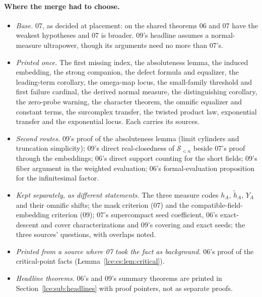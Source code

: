 \documentclass[11pt,letterpaper]{article}
\numberwithin{equation}{section}
\theoremstyle{definition}
\theoremstyle{remark}
\newcommand{\Sk}{\mathscr S_{<\kappa}}
\newcommand{\leref}[1]{Lemma~\ref{#1}}
\begin{document}
\paragraph{Where the merge had to choose.}
\begin{itemize}
\item \emph{Base.} 07, as decided at placement: on the shared theorems 06 and
07 have the weakest hypotheses and 07 is broader. 09's headline assumes a
normal-measure ultrapower, though its arguments need no more than 07's.
\item \emph{Printed once.} The first missing index, the absoluteness lemma,
the induced embedding, the strong companion, the defect formula and
equalizer, the leading-term corollary, the omega-map locus, the small-family
threshold and first failure cardinal, the derived normal measure, the
distinguishing corollary, the zero-probe warning, the character theorem, the
omnific equalizer and constant terms, the surcomplex transfer, the twisted
product law, exponential transfer and the exponential locus. Each carries
its sources.
\item \emph{Second routes.} 09's proof of the absoluteness lemma (limit
cylinders and truncation simplicity); 09's direct real-closedness of $\Sk$
beside 07's proof through the embeddings; 06's direct support counting for
the short fields; 09's fiber argument in the weighted evaluation; 06's
formal-evaluation proposition for the infinitesimal factor.
\item \emph{Kept separately, as different statements.} The three measure
codes $h_A$, $\tilde h_A$, $Y_A$ and their omnific shifts; the mask criterion
(07) and the compatible-field-embedding criterion (09); 07's supercompact
seed coefficient, 06's exact-descent and cover characterizations and 09's
covering and exact seeds; the three sources' questions, with overlaps noted.
\item \emph{Printed from a source where 07 took the fact as background.}
06's proof of the critical-point facts (\leref{lce:cs:lem:critical}).
\item \emph{Headline theorems.} 06's and 09's summary theorems are printed
in Section~\ref{lce:sub:headlines} with proof pointers, not as separate
proofs.
\end{itemize}
\end{document}
